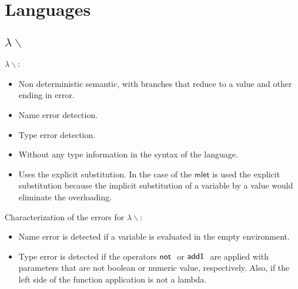 \documentclass[preprint,authoryear,sort&compress,9pt,nocopyrightspace]{article}
\newcommand{\negacion}[1]{\mathsf{not} \ #1}
\newcommand{\suma}[1]{\mathsf{add1} \ #1}
\newcommand{\semanticA}{$\lambda\backslash$}
\begin{document}
\section{Languages}

\subsection{\semanticA}

\semanticA:
\begin{itemize}
\item Non deterministic semantic, with branches that reduce to a value and other ending in error.
\item Name error detection.
\item Type error detection.
\item Without any type information in the syntax of the language.
\item Uses the explicit substitution. In the case of the $\mathsf{mlet}$ is used the explicit substitution because the implicit substitution of a variable by a value would eliminate the overloading.
\end{itemize} 
Characterization of the errors for \semanticA:

\begin{itemize}
\item Name error is detected if a variable is evaluated in the empty environment.
\item Type error is detected if the operators $\negacion$ or $\suma$ are applied with parameters that are not boolean or numeric value, respectively. Also, if the left side of the function application is not a lambda.
\end{itemize}
\end{document}
